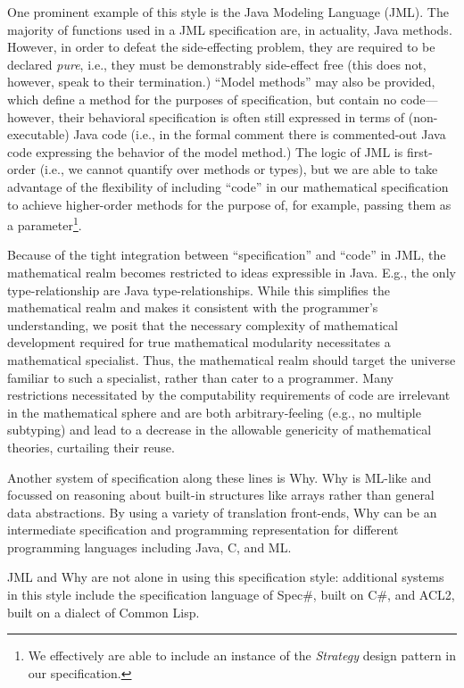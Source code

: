 One prominent example of this style is the Java Modeling Language (JML)\cite{leavensJML}.  The majority of functions used in a JML specification are, in actuality, Java methods.  However, in order to defeat the side-effecting problem, they are required to be declared \emph{pure}, i.e., they must be demonstrably side-effect free (this does not, however, speak to their termination.)  ``Model methods'' may also be provided, which define a method for the purposes of specification, but contain no code---however, their behavioral specification is often still expressed in terms of (non-executable) Java code (i.e., in the formal comment there is commented-out Java code expressing the behavior of the model method.)  The logic of JML is first-order (i.e., we cannot quantify over methods or types), but we are able to take advantage of the flexibility of including ``code'' in our mathematical specification to achieve higher-order methods for the purpose of, for example, passing them as a parameter\footnote{We effectively are able to include an instance of the \emph{Strategy} design pattern in our specification.}.

Because of the tight integration between ``specification'' and ``code'' in JML, the mathematical realm becomes restricted to ideas expressible in Java.  E.g., the only type-relationship are Java type-relationships.  While this simplifies the mathematical realm and makes it consistent with the programmer's understanding, we posit that the necessary complexity of mathematical development required for true mathematical modularity necessitates a mathematical specialist.  Thus, the mathematical realm should target the universe familiar to such a specialist, rather than cater to a programmer.  Many restrictions necessitated by the computability requirements of code are irrelevant in the mathematical sphere and are both arbitrary-feeling (e.g., no multiple subtyping) and lead to a decrease in the allowable genericity of mathematical theories, curtailing their reuse.

Another system of specification along these lines is Why\cite{bobotWhy}.  Why is ML-like and focussed on reasoning about built-in structures like arrays rather than general data abstractions.  By using a variety of translation front-ends, Why can be an intermediate specification and programming representation for different programming languages including Java, C, and ML.

JML and Why are not alone in using this specification style: additional systems in this style include the specification language of Spec\#\cite{specsharp}, built on C\#, and ACL2\cite{kaufmannACL2}, built on a dialect of Common Lisp.

